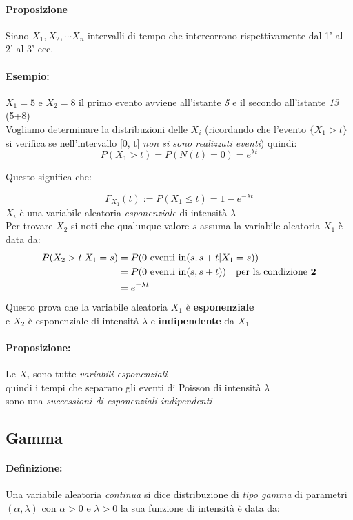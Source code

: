 \documentclass[]{article}
\newcommand{\definizione}{\paragraph{Definizione:}}
\begin{document}
    \paragraph{Proposizione} Siano $X_1, X_2, \cdots X_n$ intervalli di tempo che intercorrono rispettivamente dal 1' al 2' al 3' ecc. \\
    \paragraph{Esempio:} $X_1 = 5$ e $X_2 = 8$ il primo evento avviene all'istante \textit{5} e il secondo all'istante \textit{13} (5+8) \\
    Vogliamo determinare la distribuzioni delle $X_i$ (ricordando che l'evento $\{X_1 > t\}$ si verifica se nell'intervallo [0, t] \textit{non si sono realizzati eventi}) quindi:
    \[ P(X_1 > t) = P(N(t) = 0) = e^{\lambda t} \]
    \centerline{Questo significa che:}
    \[ F_{X_1}(t) := P(X_1 \leq t) = 1 - e^{-\lambda t} \]
    $X_i$ è una variabile aleatoria \textit{esponenziale} di intensità $\lambda$ \\
    Per trovare $X_2$ si noti che qualunque valore $s$ assuma la variabile aleatoria $X_1$ è data da:
    \begin{equation*}
        \begin{split}
            P(X_2 > t | X_1 = s) &= P(0 \text{ eventi in} (s, s + t | X_1 = s)) \\
            &= P(0 \text{ eventi in} (s, s + t )) \quad \text{per la condizione \textbf{2}} \\
            &= e^{-\lambda t}
        \end{split}
    \end{equation*}
    Questo prova che la variabile aleatoria $X_1$ è \textbf{esponenziale} \\
    e $X_2$ è esponenziale di intensità $\lambda$ e \textbf{indipendente} da $X_1$ \\
    \paragraph{Proposizione:} Le $X_i$ sono tutte \textit{variabili esponenziali} \\
    quindi i tempi che separano gli eventi di Poisson di intensità $\lambda$ \\
    sono una \textit{successioni di esponenziali indipendenti} 

    \subsection{Gamma}
    \definizione Una variabile aleatoria \textit{continua} si dice distribuzione di \textit{tipo gamma}
    di parametri $(\alpha, \lambda)$ con $\alpha > 0$ e $\lambda > 0$ la sua funzione di intensità è data da:
\end{document}
